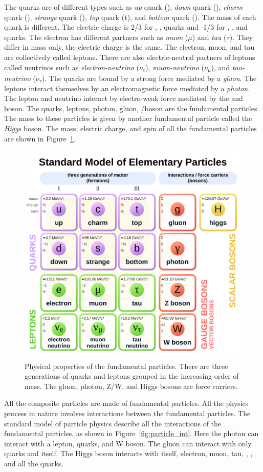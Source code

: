 The quarks are of different types such as \textit{up} quark (\PQu), \textit{down} quark (\PQd), 
\textit{charm} quark (\PQc), \textit{strange} quark (\PQs), \textit{top} quark (t), and \textit{bottom}
quark (\PQb). The mass of each quark is different. The electric charge is 2/3 for \PQu, \PQc, \PQt 
quarks and -1/3 for \PQs, \PQb, and \PQd quarks. The electron has different partners such as 
\textit{muon} ($\mu$) and \textit{tau} ($\tau$). They differ in mass only, the electric charge 
is the same. The electron, muon, and tau are collectively called leptons. There are also 
electric-neutral partners of leptons called neutrinos such as \textit{electron-neutrino} ($\nu_e$), 
\textit{muon-neutrino} ($\nu_\mu$), and \textit{tau-neutrino} ($\nu_\tau$). The quarks are bound 
by a strong force mediated by a \textit{gluon}. The leptons interact themselves by an electromagnetic 
force mediated by a \textit{photon}. The lepton and neutrino interact by electro-weak force 
mediated by the \PW and \PZ boson. The quarks, leptons, photon, gluon, \PW/\PZ boson are 
the fundamental particles. The mass to these particles is given
by another fundamental particle called the \textit{Higgs} boson. The mass, electric charge,
and spin of all the fundamental particles are shown in Figure~\ref{fig:sm_particles}.
\begin{figure}
  \begin{center}
  \includegraphics[width=0.80\linewidth]{Theory/Image/sm_particles.pdf}
\caption{Physical properties of the fundamental particles\cite{wikiSM}. 
	There are three generations of quarks and leptons grouped in the increasing
	order of mass. The gluon, photon, Z/W, and Higgs  bosons are force carriers.} 
  \label{fig:sm_particles}
  \end{center}
\end{figure}
All the composite particles are made of fundamental particles. All the physics
process in nature involves interactions between the fundamental particles. 
The standard model of particle physics describe all the interactions of the fundamental particles, 
as shown in Figure~\ref{fig:particle_int}. Here the photon can interact with a lepton, 
quarks, and W boson. The gluon can interact with only quarks and itself. The Higgs
boson interacts with itself, electron, muon, tau, \PW, \PZ, and all the quarks. 

